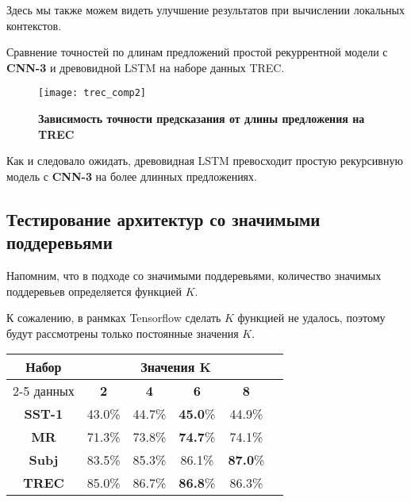 Здесь мы также можем видеть улучшение результатов при вычислении локальных контекстов.

Сравнение точностей по длинам предложений простой рекуррентной модели с \textbf{CNN-3} и древовидной LSTM на наборе данных TREC.

\begin{figure}[H]
\texttt{[image: trec\_comp2]}
\caption{\textbf{Зависимость точности предсказания от длины предложения на TREC}}
\label{fig:context_ex}
\end{figure}

Как и следовало ожидать, древовидная LSTM превосходит простую рекурсивную модель с \textbf{CNN-3} на более длинных предложениях.

\subsection{Тестирование архитектур со значимыми поддеревьями}

Напомним, что в подходе со значимыми поддеревьями, количество значимых поддеревьев определяется функцией $K$.

К сожалению, в ранмках Tensorflow сделать $K$ функцией не удалось, поэтому будут рассмотрены только постоянные значения $K$.

\vspace{5mm}
\begin{minipage}{\linewidth}
 \label{tab:title} 
\begin{tabular}{|c|c|c|c|c|c|}
\hline
\multirow{2}{*}{Набор}   &  \multicolumn{4}{c|}{Значения K} \\ \cline{2-5} 
     данных              &  \textbf{2}  & \textbf{4}   & \textbf{6} & \textbf{8} \\ \hline
\textbf{SST-1}           & 43.0\%       &  44.7\% & \textbf{45.0}\% & 44.9\%     \\ \hline
\textbf{MR}              & 71.3\%       & 73.8\%  & \textbf{74.7}\% & 74.1\%     \\ \hline
\textbf{Subj}            & 83.5\%       & 85.3\%       & 86.1\%     & \textbf{87.0}\% \\ \hline
\textbf{TREC}            & 85.0\%       & 86.7\% & \textbf{86.8}\%     & 86.3\%     \\ \hline
\end{tabular}
\end{minipage}
\vspace{5mm}

